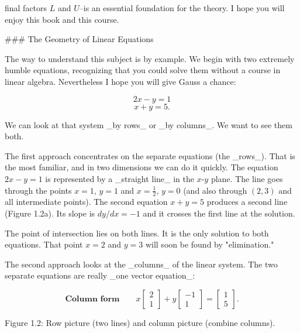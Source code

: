 final factors \(L\) and \(U\)--is an essential foundation for the theory. I hope you will enjoy this book and this course.

### The Geometry of Linear Equations

The way to understand this subject is by example. We begin with two extremely humble equations, recognizing that you could solve them without a course in linear algebra. Nevertheless I hope you will give Gauss a chance:

\[2x - y = 1\] \[x + y = 5.\]

We can look at that system _by rows_ or _by columns_. We want to see them both.

The first approach concentrates on the separate equations (the _rows_). That is the most familiar, and in two dimensions we can do it quickly. The equation \(2x-y=1\) is represented by a _straight line_ in the \(x\)-\(y\) plane. The line goes through the points \(x=1\), \(y=1\) and \(x=\frac{1}{2}\), \(y=0\) (and also through \((2,3)\) and all intermediate points). The second equation \(x+y=5\) produces a second line (Figure 1.2a). Its slope is \(dy/dx=-1\) and it crosses the first line at the solution.

The point of intersection lies on both lines. It is the only solution to both equations. That point \(x=2\) and \(y=3\) will soon be found by "elimination."

The second approach looks at the _columns_ of the linear system. The two separate equations are really _one vector equation_:

\[\textbf{Column form}\qquad x\begin{bmatrix}2\\ 1\end{bmatrix}+y\begin{bmatrix}-1\\ 1\end{bmatrix}=\begin{bmatrix}1\\ 5\end{bmatrix}.\]

Figure 1.2: Row picture (two lines) and column picture (combine columns).

 